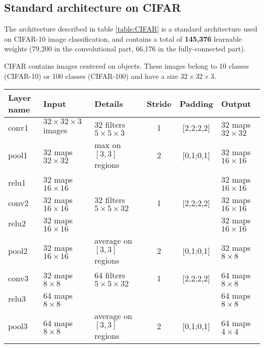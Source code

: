 \subsection{Standard architecture on CIFAR}

The architecture described in table \ref{table:CIFAR} is a standard architecture used on CIFAR-10 image classification, and contains a total of 
\textbf{145,376} learnable weights (79,200 in the convolutional part, 66,176 in the fully-connected part). 

CIFAR \cite{CIFAR} contains  images centered on objects. These images belong to 10 classes (CIFAR-10) or 100 classes (CIFAR-100) and have a size $32 
\times 32 \times 3$. 

\begin{table}[h]
\begin{center}
 \begin{tabular}{|l||l||l|c|c||l|}
   \hline
   Layer name & Input                          & Details                                 & Stride & Padding   & Output                 \\
   \hline
   \hline
   conv1      & $32 \times 32 \times 3$ images & 32 filters $5 \times 5 \times 3$        & 1      & [2,2;2,2] & 32 maps $32 \times 32$ \\
   pool1      & 32 maps $32 \times 32$         & max on $[3, 3]$ regions                 & 2      & [0,1;0,1] & 32 maps $16 \times 16$ \\
   relu1      & 32 maps $16 \times 16$         &                                         &        &           & 32 maps $16 \times 16$ \\
   \hline
   conv2      & 32 maps $16 \times 16$         & 32 filters $5 \times 5 \times 32$       & 1      & [2,2;2,2] & 32 maps $16 \times 16$ \\
   relu2      & 32 maps $16 \times 16$         &                                         &        &           & 32 maps $16 \times 16$ \\
   pool2      & 32 maps $16 \times 16$         & average on $[3, 3]$ regions             & 2      & [0,1;0,1] & 32 maps $8 \times 8$   \\
   \hline
   conv3      & 32 maps $8 \times 8$           & 64 filters $5 \times 5 \times 32$       & 1      & [2,2;2,2] & 64 maps $8 \times 8$   \\
   relu3      & 64 maps $8 \times 8$           &                                         &        &           & 64 maps $8 \times 8$   \\
   pool3      & 64 maps $8 \times 8$           & average on $[3, 3]$ regions             & 2      & [0,1;0,1] & 64 maps $4 \times 4$   \\

\end{tabular}
\end{center}
\end{table}

